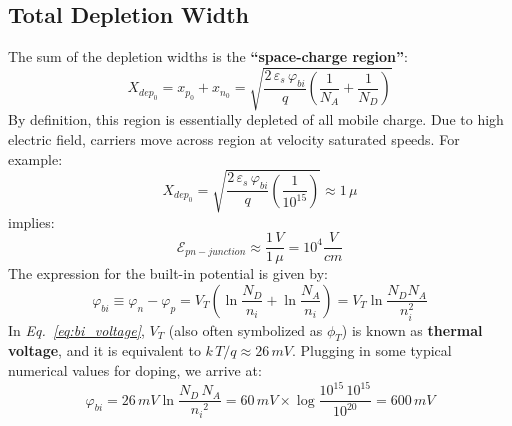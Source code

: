 \subsection{Total Depletion Width}
The sum of the depletion widths is the \textbf{“space-charge region”}:
    \begin{equation}
        X_{{dep}_0} = x_{p_0} + x_{n_0} = 
        \sqrt{ \frac{2\,\varepsilon_s\,\varphi_{bi}}{q} \left( \frac{1}{N_A} + \frac{1}{N_D} \right) } 
    \end{equation}
By definition, this region is essentially depleted of all mobile charge.  Due to high electric field, carriers move across region at velocity saturated speeds.  For example:
    \begin{equation} 
        X_{{dep}_0} = \sqrt{ \frac{2\,\varepsilon_s\,\varphi_{bi}}{q} \left( \frac{1}{{10}^{15}} \right) } \approx 1\,\mu
    \end{equation}
implies:
    \begin{equation} 
        \mathcal{E}_{pn-junction} \approx \frac{1\,V}{1\,\mu} = {10}^4\frac{V}{cm} 
    \end{equation}
The expression for the built-in potential is given by:
    \begin{equation} 
        {\varphi _{bi}} \equiv {\varphi _n} - {\varphi _p} = {V_T}\left( {\ln \frac{{{N_D}}}{{{n_i}}} + \ln \frac{{{N_A}}}{{{n_i}}}} \right) = {V_T}\ln \frac{{{N_D}{N_A}}}{{n_i^2}}
        \label{eq:bi_voltage}
    \end{equation}
In \emph{Eq.~\ref{eq:bi_voltage}}, $V_T$ (also often symbolized as $\phi_T$) is known as \textbf{thermal voltage}, and it is equivalent to $k\,T/q \approx 26\,mV$.
Plugging in some typical numerical values for doping, we arrive at:
    \begin{equation} 
        \varphi_{bi} = 26\,mV \ln \frac{N_D\,N_A}{{n_i}^2} = 60\,mV \times 
        \log \frac{{10}^{15}\,{10}^{15}}{{10}^{20}} = 600\,mV 
    \end{equation}
